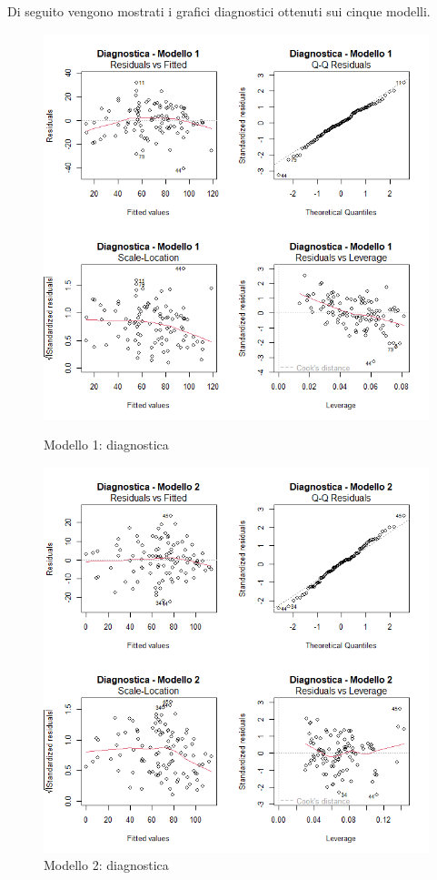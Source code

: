 Di seguito vengono mostrati i grafici diagnostici ottenuti sui cinque modelli.
\begin{figure}[H]
	\centering
	\begin{minipage}{0.48\textwidth}
		\centering
		\includegraphics[width=\linewidth]{graphs/diagnostica/modello1}
		\caption{Modello 1: diagnostica}
		\label{fig:diagnostica_modello1}
	\end{minipage}
	\hfill
	\begin{minipage}{0.48\textwidth}
		\centering
		\includegraphics[width=\linewidth]{graphs/diagnostica/modello2}
		\caption{Modello 2: diagnostica}
		\label{fig:diagnostica_modello2}
	\end{minipage}
\end{figure}

